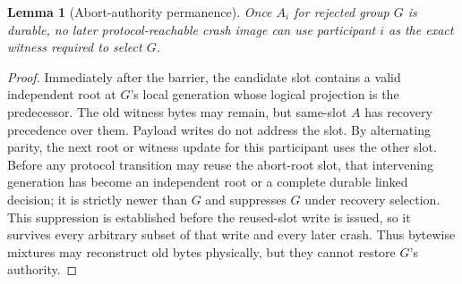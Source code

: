 \documentclass[10pt,twocolumn]{article}
\newtheorem{lemma}{Lemma}
\theoremstyle{remark}
\begin{document}
\begin{lemma}[Abort-authority permanence]\label{lem:rollback}
Once $A_i$ for rejected group $G$ is durable, no later protocol-reachable crash image can use
participant $i$ as the exact witness required to select $G$.
\end{lemma}
\begin{proof}
Immediately after the barrier, the candidate slot contains a valid independent root at $G$'s local
generation whose logical projection is the predecessor. The old witness bytes may remain, but
same-slot $A$ has recovery precedence over them. Payload writes do not address the slot. By
alternating parity, the next
root or witness update for this participant uses the other slot. Before any protocol transition may
reuse the abort-root slot, that intervening generation has become an independent root or a complete
durable linked decision; it is strictly newer than $G$ and suppresses $G$ under recovery selection.
This suppression is established before the reused-slot write is issued, so it survives every
arbitrary subset of that write and every later crash. Thus bytewise mixtures may reconstruct old
bytes physically, but they cannot restore $G$'s authority.
\end{proof}
\end{document}
